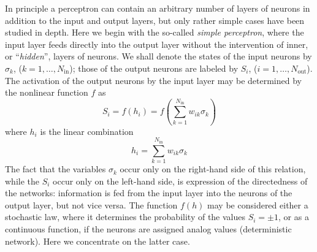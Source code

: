 In principle a perceptron can contain an arbitrary number of layers of neurons in addition to the input and output layers, but only rather simple cases have been studied in depth. Here we begin with the so-called \emph{simple perceptron}, where the input layer feeds directly into the output layer without the intervention of inner, or ``\emph{hidden}'', layers of neurons. We shall denote the states of the input neurons by $\sigma_k$, ($k=1,\ldots,N_{\text{in}}$); those of the output neurons are labeled by $S_i$, ($i=1,\ldots,N_{\text{out}}$). The activation of the output neurons by the input layer may be determined by the nonlinear function $f$ as
\begin{equation}\label{SiPerceptron}
S_i=f(h_i)=f\!\left(\sum_{k=1}^{N_{\text{in}}}w_{ik}\sigma_k\right)
\end{equation}
where $h_i$ is the linear combination
\begin{equation}\label{hPerceptron}
h_i=\sum_{k=1}^{N_{\text{in}}}w_{ik}\sigma_k
\end{equation}
The fact that the variables $\sigma_k$ occur only on the right-hand side of this relation, while the $S_i$ occur only on the left-hand side, is expression of the directedness of the networks: information is fed from the input layer into the neurons of the output layer, but not vice versa. The function $f(h)$ may be considered either a stochastic law, where it determines the probability of the values $S_i=\pm1$, or as a continuous function, if the neurons are assigned analog values (deterministic network). Here we concentrate on the latter case.


